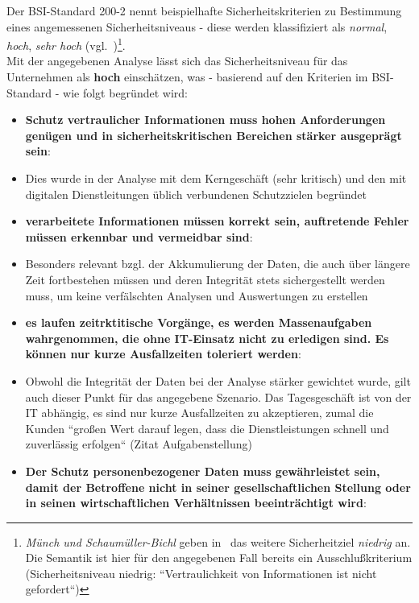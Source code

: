 Der BSI-Standard 200-2 nennt beispielhafte Sicherheitskriterien zu Bestimmung eines angemessenen Sicherheitsniveaus - diese werden klassifiziert als \textit{normal}, \textit{hoch}, \textit{sehr hoch} (vgl.~\cite[24 f.]{BSI200-2})\footnote{
    \textit{Münch und Schaumüller-Bichl} geben in~\cite[37]{ITS2} das weitere Sicherheitziel \textit{niedrig} an. Die Semantik ist hier für den angegebenen Fall bereits ein Ausschlußkriterium (Sicherheitsniveau niedrig: ``Vertraulichkeit von Informationen ist nicht gefordert``)
}.\\


Mit der angegebenen Analyse lässt sich das Sicherheitsniveau für das Unternehmen als \textbf{hoch} einschätzen, was - basierend auf den Kriterien im BSI-Standard - wie folgt begründet wird:


\begin{itemize}
    \itemsep0.5em
    \item \textbf{Schutz vertraulicher Informationen muss hohen Anforderungen genügen und in sicherheitskritischen Bereichen stärker ausgeprägt sein}:
    \item[] Dies wurde in der Analyse mit dem Kerngeschäft (sehr kritisch) und den mit digitalen Dienstleitungen üblich verbundenen Schutzzielen begründet
    \item \textbf{verarbeitete Informationen müssen korrekt sein, auftretende Fehler müssen erkennbar und vermeidbar sind}:
    \item[] Besonders relevant bzgl. der Akkumulierung der Daten, die auch über längere Zeit fortbestehen müssen und deren Integrität stets sichergestellt werden muss, um keine verfälschten Analysen und Auswertungen zu erstellen
    \item \textbf{es laufen zeitrktitische  Vorgänge, es werden Massenaufgaben wahrgenommen, die ohne IT-Einsatz nicht zu erledigen sind. Es können nur kurze Ausfallzeiten toleriert werden}:
    \item[] Obwohl die Integrität der Daten bei der Analyse stärker gewichtet wurde, gilt auch dieser Punkt für das angegebene Szenario. Das Tagesgeschäft ist von der IT abhängig, es sind nur kurze Ausfallzeiten zu akzeptieren, zumal die Kunden ``großen Wert darauf legen, dass die Dienstleistungen schnell und zuverlässig erfolgen`` (Zitat Aufgabenstellung)
    \item \textbf{Der Schutz personenbezogener Daten muss gewährleistet sein, damit der Betroffene nicht in seiner gesellschaftlichen Stellung oder in seinen wirtschaftlichen Verhältnissen beeinträchtigt wird}:

\end{itemize}
